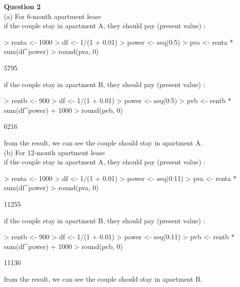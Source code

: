 \documentclass[a4paper,12pt]{article}
\begin{document}
\noindent\textbf{Question 2}\\

\noindent (a) For 6-month apartment lease\\
\noindent if the couple stay in apartment A, they should pay (present value) :\\
\begin{Schunk}
\begin{Sinput}
> renta <- 1000
> df <- 1/(1 + 0.01)
> power <- seq(0:5)
> pva <- renta * sum(df^power)
> round(pva, 0)
\end{Sinput}
\begin{Soutput}
[1] 5795
\end{Soutput}
\end{Schunk}
\noindent if the couple stay in apartment B, they should pay (present value) :\\
\begin{Schunk}
\begin{Sinput}
> rentb <- 900
> df <- 1/(1 + 0.01)
> power <- seq(0:5)
> pvb <- rentb * sum(df^power) + 1000
> round(pvb, 0)
\end{Sinput}
\begin{Soutput}
[1] 6216
\end{Soutput}
\end{Schunk}
from the result, we can see the couple should stay in apartment A.\\

\noindent (b) For 12-month apartment lease\\
\noindent if the couple stay in apartment A, they should pay (present value) :\\
\begin{Schunk}
\begin{Sinput}
> renta <- 1000
> df <- 1/(1 + 0.01)
> power <- seq(0:11)
> pva <- renta * sum(df^power)
> round(pva, 0)
\end{Sinput}
\begin{Soutput}
[1] 11255
\end{Soutput}
\end{Schunk}
\noindent if the couple stay in apartment B, they should pay (present value) :\\
\begin{Schunk}
\begin{Sinput}
> rentb <- 900
> df <- 1/(1 + 0.01)
> power <- seq(0:11)
> pvb <- rentb * sum(df^power) + 1000
> round(pvb, 0)
\end{Sinput}
\begin{Soutput}
[1] 11130
\end{Soutput}
\end{Schunk}
from the result, we can see the couple should stay in apartment B.\\
\end{document}
